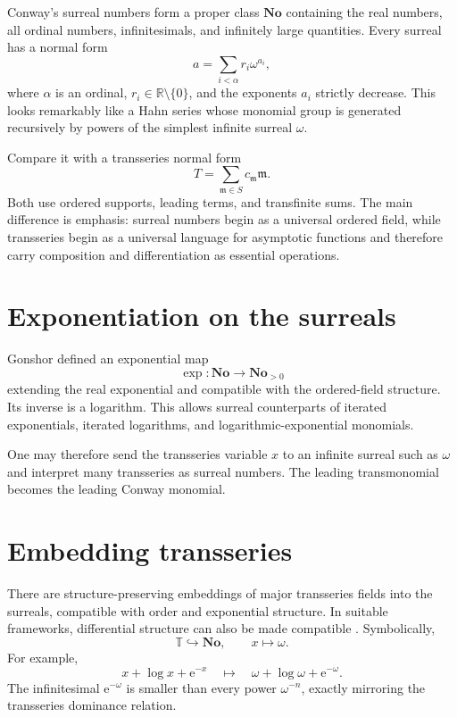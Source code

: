\documentclass[11pt,oneside]{book}
\theoremstyle{definition}
\theoremstyle{remark}
\newcommand{\R}{\mathbb{R}}
\newcommand{\T}{\mathbb{T}}
\newcommand{\m}{\mathfrak{m}}
\newcommand{\e}{\mathrm{e}}
\begin{document}
Conway's surreal numbers form a proper class $\mathbf{No}$ containing the real
numbers, all ordinal numbers, infinitesimals, and infinitely large quantities.
Every surreal has a normal form
\begin{equation}
  a=\sum_{i<\alpha} r_i\omega^{a_i},
  \label{eq:conway-normal-form}
\end{equation}
where $\alpha$ is an ordinal, $r_i\in\R\setminus\{0\}$, and the exponents $a_i$
strictly decrease. This looks remarkably like a Hahn series whose monomial group
is generated recursively by powers of the simplest infinite surreal $\omega$.

Compare it with a transseries normal form
\[
  T=\sum_{\m\in S}c_{\m}\m.
\]
Both use ordered supports, leading terms, and transfinite sums. The main
difference is emphasis: surreal numbers begin as a universal ordered field,
while transseries begin as a universal language for asymptotic functions and
therefore carry composition and differentiation as essential operations.

\section{Exponentiation on the surreals}

Gonshor defined an exponential map
\[
  \exp:\mathbf{No}\to\mathbf{No}_{>0}
\]
extending the real exponential and compatible with the ordered-field structure.
Its inverse is a logarithm. This allows surreal counterparts of iterated
exponentials, iterated logarithms, and logarithmic-exponential monomials.

One may therefore send the transseries variable $x$ to an infinite surreal such
as $\omega$ and interpret many transseries as surreal numbers. The leading
transmonomial becomes the leading Conway monomial.

\section{Embedding transseries}

There are structure-preserving embeddings of major transseries fields into the
surreals, compatible with order and exponential structure. In suitable
frameworks, differential structure can also be made compatible
\cite{BerarducciMantovaSurreal,ADHBook}. Symbolically,
\[
  \T\hookrightarrow\mathbf{No},
  \qquad x\longmapsto\omega.
\]
For example,
\[
  x+\log x+\e^{-x}
  \quad\longmapsto\quad
  \omega+\log\omega+\e^{-\omega}.
\]
The infinitesimal $\e^{-\omega}$ is smaller than every power $\omega^{-n}$,
exactly mirroring the transseries dominance relation.
\end{document}
